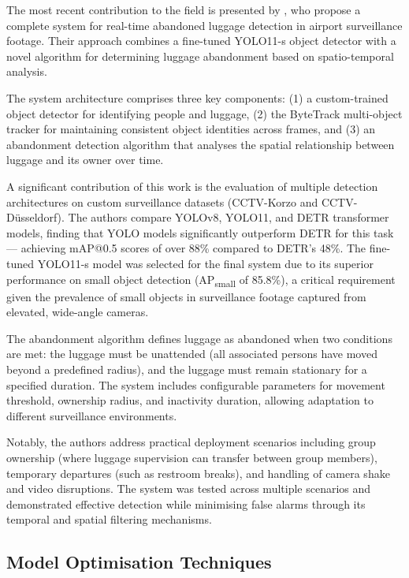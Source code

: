 The most recent contribution to the field is presented by
\citet{abandoned2025vrsalovic}, who propose a complete system for real-time
abandoned luggage detection in airport surveillance footage. Their approach
combines a fine-tuned YOLO11-s object detector with a novel algorithm for
determining luggage abandonment based on spatio-temporal analysis.

The system architecture comprises three key components: (1) a custom-trained
object detector for identifying people and luggage, (2) the ByteTrack
multi-object tracker \citep{zhang2022bytetrack} for maintaining consistent
object identities across frames, and (3) an abandonment detection algorithm
that analyses the spatial relationship between luggage and its owner over time.

A significant contribution of this work is the evaluation of multiple detection
architectures on custom surveillance datasets (CCTV-Korzo and CCTV-Düsseldorf).
The authors compare YOLOv8, YOLO11, and DETR transformer models, finding that
YOLO models significantly outperform DETR for this task --- achieving mAP@0.5
scores of over 88\% compared to DETR's 48\%. The fine-tuned YOLO11-s model was
selected for the final system due to its superior performance on small object
detection (AP\textsubscript{small} of 85.8\%), a critical requirement given the
prevalence of small objects in surveillance footage captured from elevated,
wide-angle cameras.

The abandonment algorithm defines luggage as abandoned when two conditions are
met: the luggage must be unattended (all associated persons have moved beyond a
predefined radius), and the luggage must remain stationary for a specified
duration. The system includes configurable parameters for movement threshold,
ownership radius, and inactivity duration, allowing adaptation to different
surveillance environments.

Notably, the authors address practical deployment scenarios including group
ownership (where luggage supervision can transfer between group members),
temporary departures (such as restroom breaks), and handling of camera shake
and video disruptions. The system was tested across multiple scenarios and
demonstrated effective detection while minimising false alarms through its
temporal and spatial filtering mechanisms.

\subsection{Model Optimisation Techniques}

